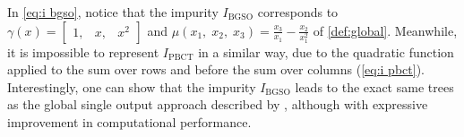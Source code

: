\documentclass[sn-mathphys-num]{sn-jnl}%
\theoremstyle{thmstyleone}%
\theoremstyle{thmstyletwo}%
\theoremstyle{thmstylethree}%
\begin{document}
In \autoref{eq:i bgso}, notice that the impurity $I_\text{BGSO}$ corresponds to $\gamma(x) = \begin{bmatrix} 1, & x, & x^2 \end{bmatrix}$ and $\mu(x_1,\; x_2,\;x_3) = \frac{x_3}{x_1} - \frac{x_2}{x_1^2}$ of \autoref{def:global}. Meanwhile, it is impossible to represent $I_\text{PBCT}$ in a similar way, due to the quadratic function applied to the sum over rows and before the sum over columns (\autoref{eq:i pbct}).
Interestingly, one can show that the impurity $I_\text{BGSO}$ leads to the exact same trees as the global single output approach described by \cite{schrynemackers_classifying_2015,pliakos_global_2018}, although with expressive improvement in computational performance.
% 
\end{document}
